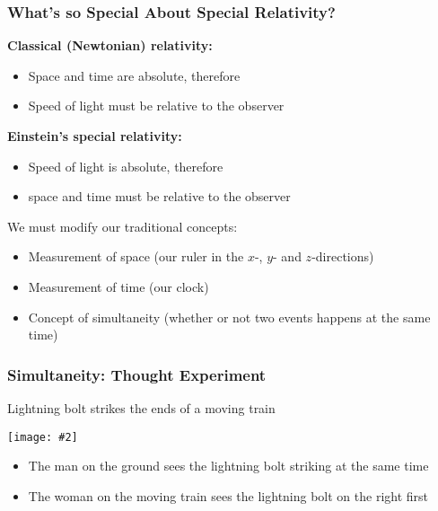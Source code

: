 \documentclass[12pt,compress,aspectratio=169]{beamer}
\newcommand{\pic}[2]{\texttt{[image: \#2]}}
\begin{document}
\begin{frame}
  \frametitle{What's so Special About Special Relativity?}

  \textbf{Classical (Newtonian) relativity:}
  \begin{itemize}
  \item Space and time are absolute, therefore
  \item Speed of light must be relative to the observer
  \end{itemize}

  \textbf{Einstein's special relativity:}
  \begin{itemize}
  \item Speed of light is absolute, therefore
  \item space and time must be relative to the observer
  \end{itemize}

  We must modify our traditional concepts:
  \begin{itemize}
  \item Measurement of space (our ruler in the $x$-, $y$- and $z$-directions)
  \item Measurement of time (our clock)
  \item Concept of simultaneity (whether or not two events happens at the
    same time)
  \end{itemize}
\end{frame}



\begin{frame}
  \frametitle{Simultaneity: Thought Experiment}
  Lightning bolt strikes the ends of a moving train
  \begin{center}
    \pic{.5}{graphics/87-1-1024x673.png}
  \end{center}
  \vspace{-0.1in}
  \begin{itemize}
  \item The man on the ground sees the lightning bolt striking at the same time
  \item The woman on the moving train sees the lightning bolt on the right first
  \end{itemize}
\end{frame}
\end{document}
